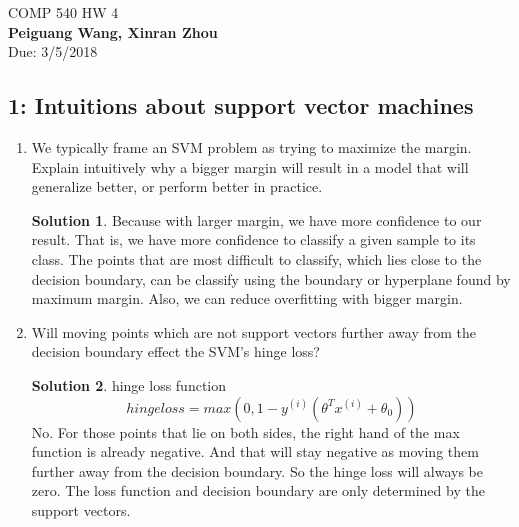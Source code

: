 \documentclass[]{book}
\theoremstyle{definition}
\newtheorem*{soln}{Solution}
\begin{document}
\begin{center}
{\Large COMP 540 \hspace{0.5cm} HW 4}\\
\textbf{Peiguang Wang, Xinran Zhou}\\ %
Due: 3/5/2018 %
\end{center}

\vspace{0.2 cm}


\subsection*{1: Intuitions about support vector machines }

\begin{enumerate}
	\item We typically frame an SVM problem as trying to maximize the margin. Explain intuitively why a bigger margin will result in a model that will generalize better, or perform better in practice.
	\begin{soln}
		Because with larger margin, we have more confidence to our result. That is, we have more confidence to classify a given sample to its class. The points that are most difficult to classify, which lies close to the decision boundary, can be classify using the boundary or hyperplane found by maximum margin.
		Also, we can reduce overfitting with bigger margin.
	\end{soln}
	\item Will moving points which are not support vectors further away from the decision boundary effect the SVM’s hinge loss?
	\begin{soln}
		hinge loss function
		$$hinge loss = max(0,1-y^{(i)}(\theta^T x^{(i)} + \theta_0))$$
		No. For those points that lie on both sides, the right hand of the max function is already negative. And that will stay negative as moving them further away from the decision boundary. So the hinge loss will always be zero. The loss function and decision boundary are only determined by the support vectors.
	\end{soln}
\end{enumerate}
\end{document}
